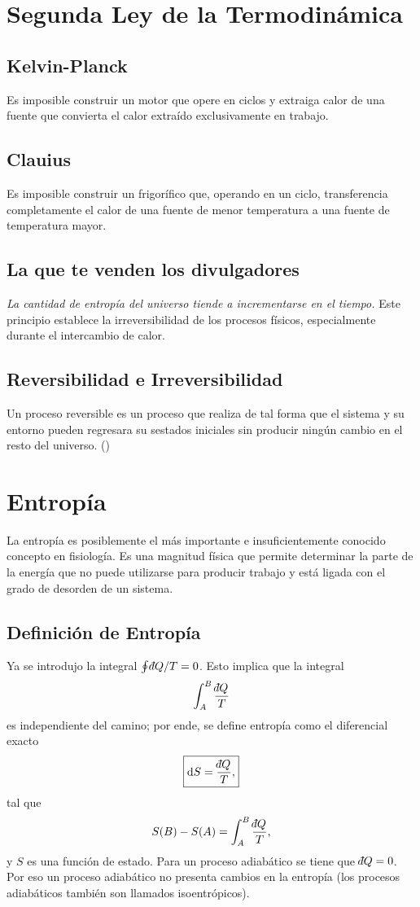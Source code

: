 \chapter{Segunda Ley de la Termodinámica}

\section{Kelvin-Planck}
Es imposible construir un motor que opere en ciclos y extraiga calor de una fuente que convierta el calor extraído exclusivamente en trabajo.

\section{Clauius}
Es imposible construir un frigorífico que, operando en un ciclo, transferencia completamente el calor de una fuente de menor temperatura a una fuente de temperatura mayor.


\section{La que te venden los divulgadores}
\textit{La cantidad de entropía del universo tiende a incrementarse en el tiempo.} Este principio establece la irreversibilidad de los procesos físicos, especialmente durante el intercambio de calor.

\section{Reversibilidad e Irreversibilidad}
Un proceso reversible es un proceso que realiza de tal forma que el sistema y su entorno pueden regresara su sestados iniciales sin producir ningún cambio en el resto del universo. ()



\chapter{Entropía}

La entropía es posiblemente el más importante e insuficientemente conocido concepto en fisiología. Es una magnitud física que permite determinar la parte de la energía que no puede utilizarse para producir trabajo y está ligada con el grado de desorden de un sistema.


\section{Definición de Entropía}
Ya se introdujo la integral $\oint \dbar Q / T = 0$. Esto implica que la integral
	$$ \int _A ^B \frac{\dbar Q}{T} $$
es independiente del camino; por ende, se define entropía como el diferencial exacto 
	$$ \boxed{ \dd{S} = \frac{\dbar Q}{T}, } $$
tal que
	$$ S(B) - S(A) = \int _A ^B \frac{\dbar Q}{T}, $$
y $S$ es una función de estado. Para un proceso adiabático se tiene que $\dbar Q = 0$. Por eso un proceso adiabático no presenta cambios en la entropía (los procesos adiabáticos también son llamados isoentrópicos).


